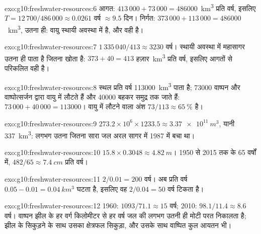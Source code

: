 \begin{solution}{exo:g10:freshwater-resources:6}
आगत: $413\,000 + 73\,000 = \num{486000}$~\unit{km^3} प्रति वर्ष, इसलिए
$T = 12\,700/486\,000 \approx \num{0.0261}$ वर्ष $\approx \num{9.5}$ दिन।
निर्गत: $373\,000 + 113\,000 = \num{486000}$~\unit{km^3}, उतना ही: वायु
स्थायी अवस्था में है, और  वही है।
\end{solution}

\begin{solution}{exo:g10:freshwater-resources:7}
$1\,335\,040/413 \approx \num{3230}$ वर्ष। स्थायी अवस्था में महासागर
उतना ही पाता है जितना खोता है: $373 + 40 = 413$ हज़ार~\unit{km^3} प्रति वर्ष,
इसलिए आगतों से परिकलित  वही है।
\end{solution}

\begin{solution}{exo:g10:freshwater-resources:8}
स्थल प्रति वर्ष \num{113000}~\unit{km^3} पाता है; \num{73000}
वाष्पन और वाष्पोत्सर्जन द्वारा वायु में लौटते हैं और \num{40000} बहकर समुद्र तक जाते हैं:
$73\,000 + 40\,000 = \num{113000}$। वायु में लौटने वाला अंश
$73/113 \approx \qty{65}{\percent}$ है।
\end{solution}

\begin{solution}{exo:g10:freshwater-resources:9}
$273.2 \times 10^6 \times 1233.5 \approx \qty{3.37e11}{m^3}$, यानी
\qty{337}{km^3}: लगभग उतना जितना सारा जल अरल सागर में
1987 में बचा था।
\end{solution}

\begin{solution}{exo:g10:freshwater-resources:10}
$15.8 \times 0.3048 \approx \qty{4.82}{m}$। 1950 से
2015 तक के 65 वर्षों में, $482/65 \approx \qty{7.4}{cm}$ प्रति वर्ष।
\end{solution}

\begin{solution}{exo:g10:freshwater-resources:11}
$2/0.01 = 200$ वर्ष।  अब प्रति वर्ष $0.05 - 0.01 =
\qty{0.04}{km^3}$ घटता है, इसलिए वह $2/0.04 = 50$ वर्ष टिकता है।
\end{solution}

\begin{solution}{exo:g10:freshwater-resources:12}
1960: $1093/71.1 \approx 15$ वर्ष; 2010: $98.1/11.4 \approx 8.6$ वर्ष।
वाष्पन झील के हर वर्ग किलोमीटर से हर वर्ष जल की लगभग उतनी ही मोटी परत
निकालता है; झील के सिकुड़ने के साथ उसका क्षेत्रफल सिकुड़ा, और उसके साथ
वाष्पित कुल आयतन भी।
\end{solution}

